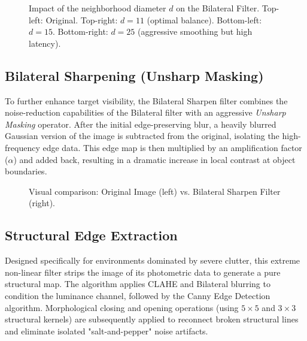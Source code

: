 \begin{figure}[hbt!]
    \centering
    
    
    \caption{Impact of the neighborhood diameter $d$ on the Bilateral Filter. Top-left: Original. Top-right: $d=11$ (optimal balance). Bottom-left: $d=15$. Bottom-right: $d=25$ (aggressive smoothing but high latency).}
    \label{fig:filter_bilateral_variations}
\end{figure}

\subsection{Bilateral Sharpening (Unsharp Masking)}
To further enhance target visibility, the Bilateral Sharpen filter combines the noise-reduction capabilities of the Bilateral filter with an aggressive \textit{Unsharp Masking} operator. After the initial edge-preserving blur, a heavily blurred Gaussian version of the image is subtracted from the original, isolating the high-frequency edge data. This edge map is then multiplied by an amplification factor ($\alpha$) and added back, resulting in a dramatic increase in local contrast at object boundaries.

\begin{figure}[hbt!]
    \centering
    \caption{Visual comparison: Original Image (left) vs. Bilateral Sharpen Filter (right).}
    \label{fig:filter_bilateral_sharpen}
\end{figure}

\subsection{Structural Edge Extraction}
Designed specifically for environments dominated by severe clutter, this extreme non-linear filter strips the image of its photometric data to generate a pure structural map. The algorithm applies CLAHE and Bilateral blurring to condition the luminance channel, followed by the Canny Edge Detection algorithm. Morphological closing and opening operations (using $5 \times 5$ and $3 \times 3$ structural kernels) are subsequently applied to reconnect broken structural lines and eliminate isolated "salt-and-pepper" noise artifacts.

